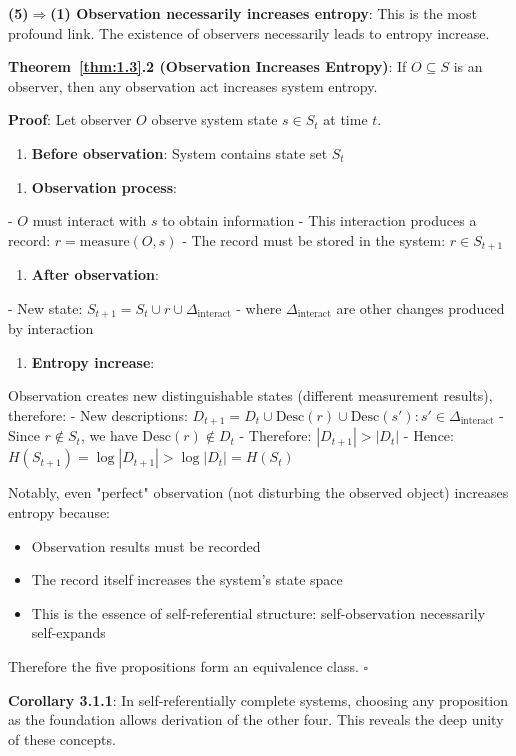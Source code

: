 \textbf{(5)$\Rightarrow$(1) Observation necessarily increases entropy}:
This is the most profound link. The existence of observers necessarily leads to entropy increase.

\textbf{Theorem~\ref{thm:1.3}.2 (Observation Increases Entropy)}:
\label{thm:1.3}
If $O \subseteq S$ is an observer, then any observation act increases system entropy.

\textbf{Proof}:
Let observer $O$ observe system state $s \in S_t$ at time $t$.

\begin{enumerate}
\item \textbf{Before observation}: System contains state set $S_t$
\end{enumerate}

\begin{enumerate}
\item \textbf{Observation process}:
\end{enumerate}
   - $O$ must interact with $s$ to obtain information
   - This interaction produces a record: $r = \text{measure}(O, s)$
   - The record must be stored in the system: $r \in S_{t+1}$

\begin{enumerate}
\item \textbf{After observation}:
\end{enumerate}
   - New state: $S_{t+1} = S_t \cup {r} \cup \Delta_{\text{interact}}$
   - where $\Delta_{\text{interact}}$ are other changes produced by interaction

\begin{enumerate}
\item \textbf{Entropy increase}:
\end{enumerate}
   Observation creates new distinguishable states (different measurement results), therefore:
   - New descriptions: $D_{t+1} = D_t \cup {\text{Desc}(r)} \cup {\text{Desc}(s') : s' \in \Delta_{\text{interact}}}$
   - Since $r \notin S_t$, we have $\text{Desc}(r) \notin D_t$
   - Therefore: $|D_{t+1}| > |D_t|$
   - Hence: $H(S_{t+1}) = \log |D_{t+1}| > \log |D_t| = H(S_t)$

Notably, even "perfect" observation (not disturbing the observed object) increases entropy because:
\begin{itemize}
\item Observation results must be recorded
\item The record itself increases the system's state space
\item This is the essence of self-referential structure: self-observation necessarily self-expands
\end{itemize}

Therefore the five propositions form an equivalence class. $\square$

\textbf{Corollary 3.1.1}:
\label{thm:1.3}
In self-referentially complete systems, choosing any proposition as the foundation allows derivation of the other four. This reveals the deep unity of these concepts.

